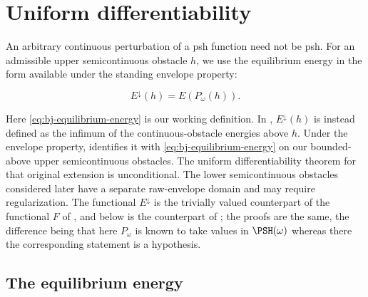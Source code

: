 \section{Uniform differentiability}
\label{sec:ch47-differentiability}

An arbitrary continuous perturbation of a psh function need not be psh.
For an admissible upper semicontinuous obstacle $h$, we use the equilibrium
energy in the form available under the standing envelope property:

\[
                       E^\downarrow(h)=E(P_\omega(h)).
\tag{47.17}\label{eq:bj-equilibrium-energy}
\]

Here \eqref{eq:bj-equilibrium-energy} is our working definition.
In \cite[Definition~8.2]{BJ22}, $E^\downarrow(h)$ is instead defined
as the infimum of the continuous-obstacle energies above $h$.
Under the envelope property, \cite[Proposition~8.3(iv)]{BJ22}
identifies it with \eqref{eq:bj-equilibrium-energy} on our bounded-above
upper semicontinuous obstacles. The uniform differentiability theorem
for that original extension is unconditional. The lower semicontinuous
obstacles considered later have a separate raw-envelope domain and may
require regularization.  The functional $E^\downarrow$ is the trivially valued
counterpart of the functional $F$ of
, and
 below is the counterpart of
; the proofs are the same, the difference
being that here $P_\omega$ is known to take values in $\PSH(\omega)$
whereas there the corresponding statement is a hypothesis.

\subsection{The equilibrium energy}
\label{sec:ch47-equilibrium}

